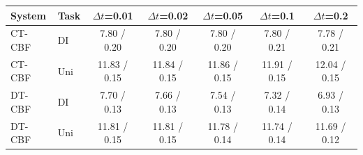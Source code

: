 \begin{tabular}{llccccc}
\hline
System & Task & $\Delta t$=0.01 & $\Delta t$=0.02 & $\Delta t$=0.05 & $\Delta t$=0.1 & $\Delta t$=0.2 \\
\hline
CT-CBF & DI & 7.80 / 0.20 & 7.80 / 0.20 & 7.80 / 0.20 & 7.80 / 0.21 & 7.78 / 0.21 \\
CT-CBF & Uni & 11.83 / 0.15 & 11.84 / 0.15 & 11.86 / 0.15 & 11.91 / 0.15 & 12.04 / 0.15 \\
DT-CBF & DI & 7.70 / 0.13 & 7.66 / 0.13 & 7.54 / 0.13 & 7.32 / 0.14 & 6.93 / 0.13 \\
DT-CBF & Uni & 11.81 / 0.15 & 11.81 / 0.15 & 11.78 / 0.14 & 11.74 / 0.14 & 11.69 / 0.12 \\
\hline
\end{tabular}

